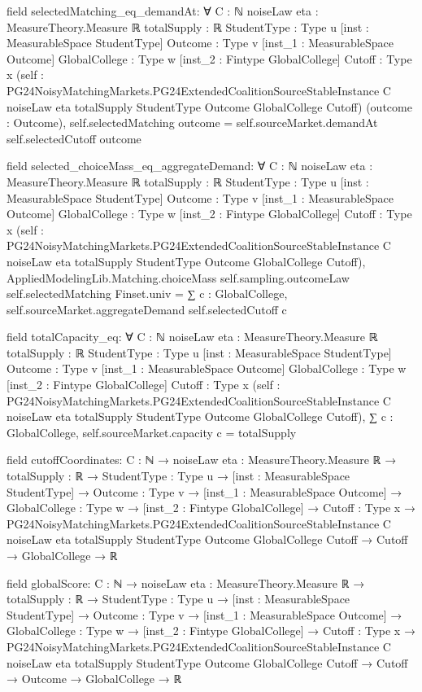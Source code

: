 \documentclass[10pt]{article}
\begin{document}
\begin{ReviewVerbatim}
field selectedMatching_eq_demandAt:
∀ {C : ℕ} {noiseLaw eta : MeasureTheory.Measure ℝ} {totalSupply : ℝ} {StudentType : Type u}
  [inst : MeasurableSpace StudentType] {Outcome : Type v} [inst_1 : MeasurableSpace Outcome] {GlobalCollege : Type w}
  [inst_2 : Fintype GlobalCollege] {Cutoff : Type x}
  (self :
    PG24NoisyMatchingMarkets.PG24ExtendedCoalitionSourceStableInstance C noiseLaw eta totalSupply StudentType Outcome
      GlobalCollege Cutoff)
  (outcome : Outcome), self.selectedMatching outcome = self.sourceMarket.demandAt self.selectedCutoff outcome

field selected_choiceMass_eq_aggregateDemand:
∀ {C : ℕ} {noiseLaw eta : MeasureTheory.Measure ℝ} {totalSupply : ℝ} {StudentType : Type u}
  [inst : MeasurableSpace StudentType] {Outcome : Type v} [inst_1 : MeasurableSpace Outcome] {GlobalCollege : Type w}
  [inst_2 : Fintype GlobalCollege] {Cutoff : Type x}
  (self :
    PG24NoisyMatchingMarkets.PG24ExtendedCoalitionSourceStableInstance C noiseLaw eta totalSupply StudentType Outcome
      GlobalCollege Cutoff),
  AppliedModelingLib.Matching.choiceMass self.sampling.outcomeLaw self.selectedMatching Finset.univ =
    ∑ c : GlobalCollege, self.sourceMarket.aggregateDemand self.selectedCutoff c

field totalCapacity_eq:
∀ {C : ℕ} {noiseLaw eta : MeasureTheory.Measure ℝ} {totalSupply : ℝ} {StudentType : Type u}
  [inst : MeasurableSpace StudentType] {Outcome : Type v} [inst_1 : MeasurableSpace Outcome] {GlobalCollege : Type w}
  [inst_2 : Fintype GlobalCollege] {Cutoff : Type x}
  (self :
    PG24NoisyMatchingMarkets.PG24ExtendedCoalitionSourceStableInstance C noiseLaw eta totalSupply StudentType Outcome
      GlobalCollege Cutoff),
  ∑ c : GlobalCollege, self.sourceMarket.capacity c = totalSupply

field cutoffCoordinates:
{C : ℕ} →
  {noiseLaw eta : MeasureTheory.Measure ℝ} →
    {totalSupply : ℝ} →
      {StudentType : Type u} →
        [inst : MeasurableSpace StudentType] →
          {Outcome : Type v} →
            [inst_1 : MeasurableSpace Outcome] →
              {GlobalCollege : Type w} →
                [inst_2 : Fintype GlobalCollege] →
                  {Cutoff : Type x} →
                    PG24NoisyMatchingMarkets.PG24ExtendedCoalitionSourceStableInstance C noiseLaw eta totalSupply
                        StudentType Outcome GlobalCollege Cutoff →
                      Cutoff → GlobalCollege → ℝ

field globalScore:
{C : ℕ} →
  {noiseLaw eta : MeasureTheory.Measure ℝ} →
    {totalSupply : ℝ} →
      {StudentType : Type u} →
        [inst : MeasurableSpace StudentType] →
          {Outcome : Type v} →
            [inst_1 : MeasurableSpace Outcome] →
              {GlobalCollege : Type w} →
                [inst_2 : Fintype GlobalCollege] →
                  {Cutoff : Type x} →
                    PG24NoisyMatchingMarkets.PG24ExtendedCoalitionSourceStableInstance C noiseLaw eta totalSupply
                        StudentType Outcome GlobalCollege Cutoff →
                      Cutoff → Outcome → GlobalCollege → ℝ


\end{ReviewVerbatim}
\end{document}
